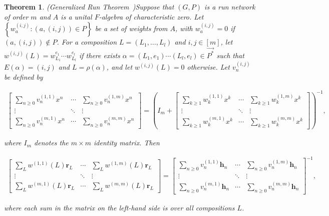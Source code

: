 \documentclass[11pt,reqno]{amsart}
\numberwithin{equation}{section}
\theoremstyle{plain}
\newtheorem{theorem}{Theorem}[section]
\theoremstyle{definition}
\begin{document}
\begin{theorem}{(Generalized Run Theorem~\cite{zhu17})}\label{thm:gen run thm}
  Suppose that $(G, P)$ is a run network of order $m$ and $A$ is a unital $F$-algebra of characteristic zero. Let $\left\{w_a^{(i , j)}:(a,(i, j)) \in P\right\}$ be a set of weights from $A$, with $w_a^{(i, j)}=0$ if $(a,(i, j)) \notin P$. For a composition $L=\left(L_1, \ldots, L_l\right)$ and $i, j \in[m]$, let $w^{(i, j)}(L)=w_{L_1}^{e_1} \cdots w_{L_l}^{e_l}$ if there exists $\alpha=\left(L_1, e_1\right) \cdots\left(L_l, e_l\right) \in \overrightarrow{P^*}$ such that $E(\alpha)=(i, j)$ and $L=\rho(\alpha)$, and let $w^{(i, j)}(L)=0$ otherwise. Let $v_n^{(i, j)}$ be defined by
    
\begin{align*}
      \left[\begin{array}{ccc}
      \sum\limits_{n \geq 0} v_n^{(1,1)} x^n & \cdots & \sum\limits_{n \geq 0} v_n^{(1, m)} x^n \\
      \vdots & \ddots & \vdots \\
      \sum\limits_{n \geq 0} v_n^{(m, 1)} x^n & \cdots & \sum\limits_{n \geq 0} v_n^{(m, m)} x^n
  \end{array}\right]=\left(I_m+\left[\begin{array}{ccc}
      \sum\limits_{k \geq 1} w_k^{(1,1)} x^k & \cdots & \sum\limits_{k \geq 1} w_k^{(1, m)} x^k \\
      \vdots & \ddots & \vdots \\
      \sum\limits_{k \geq 1} w_k^{(m, 1)} x^k & \cdots & \sum\limits_{k \geq 1} w_k^{(m, m)} x^k
  \end{array}\right]\right)^{-1},
\end{align*}

  where $I_m$ denotes the $m \times m$ identity matrix. Then
    
  \begin{align}
      \left[\begin{array}{ccc}\label{nonComGen}
      \sum\limits_L w^{(1,1)}(L) \mathbf{r}_L & \cdots & \sum\limits_L w^{(1, m)}(L) \mathbf{r}_L \\
      \vdots & \ddots & \vdots \\
      \sum\limits_L w^{(m, 1)}(L) \mathbf{r}_L & \cdots & \sum\limits_L w^{(m, m)}(L) \mathbf{r}_L
  \end{array}\right]=\left[\begin{array}{ccc}
      \sum\limits_{n \geq 0} v_n^{(1,1)} \mathbf{h}_n & \cdots & \sum\limits_{n \geq 0} v_n^{(1, m)} \mathbf{h}_n \\
      \vdots & \ddots & \vdots \\
      \sum\limits_{n \geq 0} v_n^{(m, 1)} \mathbf{h}_n & \cdots & \sum\limits_{n \geq 0} v_n^{(m, m)} \mathbf{h}_n
  \end{array}\right]^{-1},
  \end{align}

    
  where each sum in the matrix on the left-hand side is over all compositions $L$.
\end{theorem}
\end{document}
